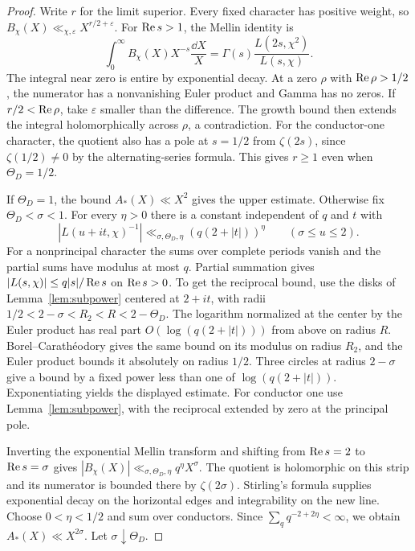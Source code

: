 \begin{proof}
Write \(r\) for the limit superior. Every fixed character has positive weight, so \(B_\chi(X)\ll_{\chi,\varepsilon} X^{r/2+\varepsilon}\). For \(\operatorname{Re} s>1\), the Mellin identity is
\[
 \int_0^\infty B_\chi(X)X^{-s}\frac{\dd X}{X}
 =\Gamma(s)\frac{L(2s,\chi^2)}{L(s,\chi)} .
\]
The integral near zero is entire by exponential decay. At a zero \(\rho\) with \(\operatorname{Re}\rho>1/2\), the numerator has a nonvanishing Euler product and Gamma has no zeros. If \(r/2<\operatorname{Re}\rho\), take \(\varepsilon\) smaller than the difference. The growth bound then extends the integral holomorphically across \(\rho\), a contradiction. For the conductor-one character, the quotient also has a pole at \(s=1/2\) from \(\zeta(2s)\), since \(\zeta(1/2)\ne0\) by the alternating-series formula. This gives \(r\ge1\) even when \(\Theta_D=1/2\).

If \(\Theta_D=1\), the bound \(A_*(X)\ll X^2\) gives the upper estimate. Otherwise fix \(\Theta_D<\sigma<1\). For every \(\eta>0\) there is a constant independent of \(q\) and \(t\) with
\[
 |L(u+it,\chi)^{-1}|
 \ll_{\sigma,\Theta_D,\eta}(q(2+|t|))^\eta
 \qquad(\sigma\le u\le2).
\]
For a nonprincipal character the sums over complete periods vanish and the partial sums have modulus at most \(q\). Partial summation gives \(|L(s,\chi)|\le q|s|/\operatorname{Re} s\) on \(\operatorname{Re} s>0\). To get the reciprocal bound, use the disks of Lemma~\ref{lem:subpower} centered at \(2+it\), with radii
\(1/2<2-\sigma<R_2<R<2-\Theta_D\).
The logarithm normalized at the center by the Euler product has real part \(O(\log(q(2+|t|)))\) from above on radius \(R\). Borel--Carath\'eodory gives the same bound on its modulus on radius \(R_2\), and the Euler product bounds it absolutely on radius \(1/2\). Three circles at radius \(2-\sigma\) give a bound by a fixed power less than one of \(\log(q(2+|t|))\). Exponentiating yields the displayed estimate. For conductor one use Lemma~\ref{lem:subpower}, with the reciprocal extended by zero at the principal pole.

Inverting the exponential Mellin transform and shifting from \(\operatorname{Re} s=2\) to \(\operatorname{Re} s=\sigma\) gives \(|B_\chi(X)|\ll_{\sigma,\Theta_D,\eta}q^\eta X^\sigma\). The quotient is holomorphic on this strip and its numerator is bounded there by \(\zeta(2\sigma)\). Stirling's formula supplies exponential decay on the horizontal edges and integrability on the new line. Choose \(0<\eta<1/2\) and sum over conductors. Since \(\sum_q q^{-2+2\eta}<\infty\), we obtain \(A_*(X)\ll X^{2\sigma}\). Let \(\sigma\downarrow\Theta_D\).
\end{proof}

